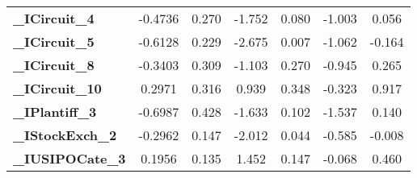 \begin{table}[H]
\begin{center}
\begin{tabular}{lcccccc}
\textbf{\_ICircuit\_4}                 &      -0.4736  &        0.270     &    -1.752  &         0.080        &       -1.003    &        0.056     \\
\textbf{\_ICircuit\_5}                 &      -0.6128  &        0.229     &    -2.675  &         0.007        &       -1.062    &       -0.164     \\
\textbf{\_ICircuit\_8}                 &      -0.3403  &        0.309     &    -1.103  &         0.270        &       -0.945    &        0.265     \\
\textbf{\_ICircuit\_10}                &       0.2971  &        0.316     &     0.939  &         0.348        &       -0.323    &        0.917     \\
\textbf{\_IPlantiff\_3}                &      -0.6987  &        0.428     &    -1.633  &         0.102        &       -1.537    &        0.140     \\
\textbf{\_IStockExch\_2}               &      -0.2962  &        0.147     &    -2.012  &         0.044        &       -0.585    &       -0.008     \\
\textbf{\_IUSIPOCate\_3}               &       0.1956  &        0.135     &     1.452  &         0.147        &       -0.068    &        0.460     \\
\bottomrule
\end{tabular}
\end{center}
\end{table}

